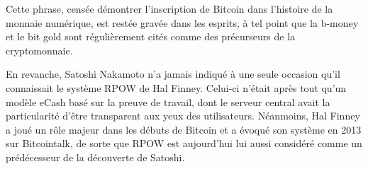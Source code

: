 Cette phrase, censée démontrer l'inscription de Bitcoin dans l'histoire de la monnaie numérique, est restée gravée dans les esprits, à tel point que la b-money et le bit gold sont régulièrement cités comme des précurseurs de la cryptomonnaie.

En revanche, Satoshi Nakamoto n'a jamais indiqué à une seule occasion qu'il connaissait le système RPOW de Hal Finney. Celui-ci n'était après tout qu'un modèle eCash basé sur la preuve de travail, dont le serveur central avait la particularité d'être transparent aux yeux des utilisateurs. Néanmoins, Hal Finney a joué un rôle majeur dans les débuts de Bitcoin et a évoqué son système en 2013 sur Bitcointalk, de sorte que RPOW est aujourd'hui lui aussi considéré comme un prédécesseur de la découverte de Satoshi. %

